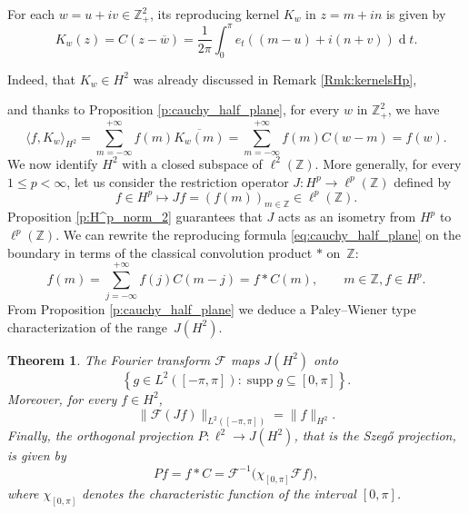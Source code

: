\documentclass[12pt,a4paper,reqno]{amsart}
\newtheorem{thm}{Theorem}[section]
\theoremstyle{definition}
\theoremstyle{definition}\newtheorem{defn}[thm]{Definition}
\begin{document}
    For each $w=u+iv\in\mathbb Z^2_+$, its reproducing kernel $K_{w}$ in $z=m+in$ is given by \begin{equation}\label{eq:kernel}
       K_{w}(z)=C(z-\overline{w})
       =\frac{1}{2\pi}\int_0^{\pi} e_t((m-u)+i(n+v))\operatorname{d}\!t.
    \end{equation}
    
    Indeed, that $K_w\in H^2$ was already discussed in Remark \ref{Rmk:kernelsHp},

    and thanks to Proposition \ref{p:cauchy_half_plane}, for every $w$ in $\mathbb Z^2_+$, we have
    \[
    \langle f, K_{w}\rangle_{H^2}= \sum_{m=-\infty}^{+\infty}f(m) \overline{K_{w}(m)}=\sum_{m=-\infty}^{+\infty} f(m)C(w-m)=f(w).
    \]
    We now identify $H^2$ with a closed subspace of $\ell^2(\mathbb Z)$. More generally, for every $1\leqslant p<\infty$, let us consider the restriction operator $J: H^p\to \ell^p(\mathbb Z)$ defined by 
    \[
    f \in H^p \mapsto Jf=(f(m))_{m\in\mathbb Z} \in \ell^p(\mathbb Z).
    \]
    Proposition \ref{p:H^p_norm_2}
    guarantees that $J$ acts as an isometry from $H^p$ to $\ell^p(\mathbb Z)$. We can rewrite the reproducing formula \eqref{eq:cauchy_half_plane} on the boundary in terms of the classical convolution product $\ast$ on~$\mathbb Z$:
    \begin{equation}\label{E:reproducingformulaconvolution}
     f(m)=\sum_{j=-\infty}^{+\infty}f(j)C(m-j)=f\ast C(m), \qquad m\in\mathbb{Z},f\in H^p.
    \end{equation}
    From Proposition \ref{p:cauchy_half_plane} we deduce a Paley--Wiener type characterization of the range~$J(H^2)$. 
    \begin{thm}\label{t:H^2_PW}
    The Fourier transform  $\mathcal F$ maps \(J(H^2)\) onto
    \[
    \left\{
    g\in L^2([-\pi,\pi])\colon \operatorname{supp}g\subseteq[0,\pi]
    \right\}.
    \]
    Moreover, for every \(f\in H^2\),
    \begin{equation}\label{eq:F_isometry}
        \|\mathcal F(Jf)\|_{L^2([-\pi,\pi])}
    =\|f\|_{H^2}.
    \end{equation}
    Finally, the orthogonal projection $P\colon\ell^2\to J(H^2)$, that is the Szeg\H o projection, is given by 
    \begin{equation}\label{E:Porthoproj}
        Pf=f\ast C=\mathcal{F}^{-1}\big(\chi_{[0,\pi]}\mathcal{F}f\big),
    \end{equation}
    where $\chi_{[0,\pi]}$ denotes the characteristic function of the interval $[0,\pi]$.
    \end{thm}
\end{document}
